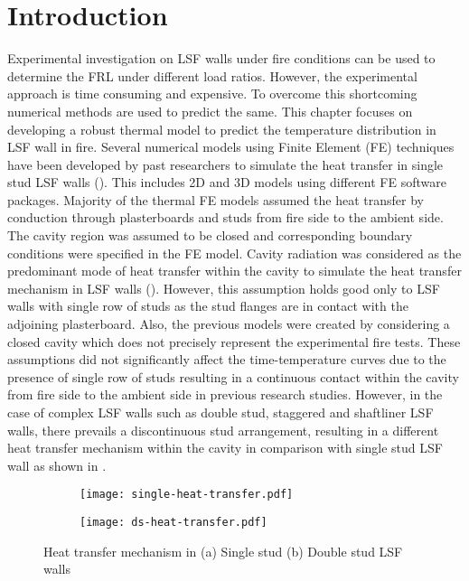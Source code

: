 \section{Introduction}

Experimental investigation on LSF walls under fire conditions can be used to determine the FRL under different load ratios. However, the experimental approach is time consuming and expensive. To overcome this shortcoming numerical methods are used to predict the same. This chapter focuses on developing a robust thermal model to predict the temperature distribution in LSF wall in fire. Several numerical models using Finite Element (FE) techniques have been developed by past researchers to simulate the heat transfer in single stud LSF walls (\cite{Feng2003,Keerthan2012,Ariyanayagam2019}). This includes 2D and 3D models using different FE software packages. Majority of the thermal FE models assumed the heat transfer by conduction through plasterboards and studs from fire side to the ambient side. The cavity region was assumed to be closed and corresponding boundary conditions were specified in the FE model. Cavity radiation was considered as the predominant mode of heat transfer within the cavity to simulate the heat transfer mechanism in LSF walls (\cite{Rusthi2017,Ariyanayagam2019}). However, this assumption holds good only to LSF walls with single row of studs as the stud flanges are in contact with the adjoining plasterboard. Also, the previous models were created by considering a closed cavity which does not precisely represent the experimental fire tests. These assumptions did not significantly affect the time-temperature curves due to the presence of single row of studs resulting in a continuous contact within the cavity from fire side to the ambient side in previous research studies. However, in the case of complex LSF walls such as double stud, staggered and shaftliner LSF walls, there prevails a discontinuous stud arrangement, resulting in a different heat transfer mechanism within the cavity in comparison with single stud LSF wall as shown in .  
\begin{figure}[!htbp]
	\centering
	\begin{subfigure}[b]{0.5\textwidth}
		\centering
		\texttt{[image: single-heat-transfer.pdf]}
		\caption{}
		\label{subfig:single-heat-transfer}
	\end{subfigure}
	\begin{subfigure}[b]{0.5\textwidth}
		\centering
		\texttt{[image: ds-heat-transfer.pdf]}
		\caption{}
		\label{subfig:ds-heat-transfer}
	\end{subfigure}
	   \caption{Heat transfer mechanism in (a) Single stud (b) Double stud LSF walls}
	   \label{fig:heat-transfer}
\end{figure} 

